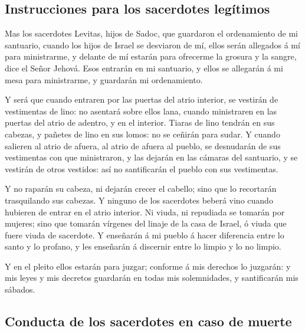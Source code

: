 \hypertarget{instrucciones-para-los-sacerdotes-leguxedtimos}{%
\subsection{Instrucciones para los sacerdotes
legítimos}\label{instrucciones-para-los-sacerdotes-leguxedtimos}}

 Mas los sacerdotes Levitas, hijos de Sadoc, que guardaron
el ordenamiento de mi santuario, cuando los hijos de Israel se desviaron
de mí, ellos serán allegados á mí para ministrarme, y delante de mí
estarán para ofrecerme la grosura y la sangre, dice el Señor Jehová.
 Esos entrarán en mi santuario, y ellos se allegarán á mi
mesa para ministrarme, y guardarán mi ordenamiento.

 Y será que cuando entraren por las puertas del atrio
interior, se vestirán de vestimentas de lino: no asentará sobre ellos
lana, cuando ministraren en las puertas del atrio de adentro, y en el
interior.  Tiaras de lino tendrán en sus cabezas, y pañetes
de lino en sus lomos: no se ceñirán para sudar.  Y cuando
salieren al atrio de afuera, al atrio de afuera al pueblo, se desnudarán
de sus vestimentas con que ministraron, y las dejarán en las cámaras del
santuario, y se vestirán de otros vestidos: así no santificarán el
pueblo con sus vestimentas.

 Y no raparán su cabeza, ni dejarán crecer el cabello; sino
que lo recortarán trasquilando sus cabezas.  Y ninguno de
los sacerdotes beberá vino cuando hubieren de entrar en el atrio
interior.  Ni viuda, ni repudiada se tomarán por mujeres;
sino que tomarán vírgenes del linaje de la casa de Israel, ó viuda que
fuere viuda de sacerdote.  Y enseñarán á mi pueblo á hacer
diferencia entre lo santo y lo profano, y les enseñarán á discernir
entre lo limpio y lo no limpio.

 Y en el pleito ellos estarán para juzgar; conforme á mis
derechos lo juzgarán: y mis leyes y mis decretos guardarán en todas mis
solemnidades, y santificarán mis sábados.

\hypertarget{conducta-de-los-sacerdotes-en-caso-de-muerte}{%
\subsection{Conducta de los sacerdotes en caso de
muerte}\label{conducta-de-los-sacerdotes-en-caso-de-muerte}}


